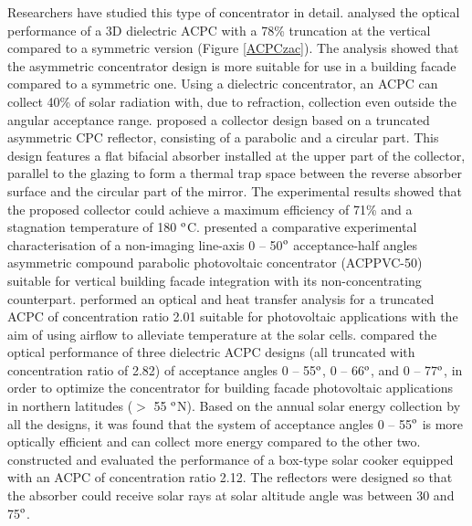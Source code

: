 Researchers have studied this type of concentrator in detail. \citet{Zacharopoulos2000} analysed the optical performance of a 3D dielectric ACPC with a 78\% truncation at the vertical compared to a symmetric version (Figure \ref{ACPCzac}). The analysis showed that the asymmetric concentrator design is more suitable for use in a building facade compared to a symmetric one. Using a dielectric concentrator, an ACPC can collect 40\% of solar radiation with, due to refraction, collection even outside the angular acceptance range. \citet{Tripanagnostopoulos2000} proposed a collector design based on a truncated asymmetric CPC reflector, consisting of a parabolic and a circular part. This design features a flat bifacial absorber installed at the upper part of the collector, parallel to the glazing to form a thermal trap space between the reverse absorber surface and the circular part of the mirror. The experimental results showed that the proposed collector could achieve a maximum efficiency of 71\% and a stagnation temperature of 180 $^{\rm{o}}$C. \citet{Mallick2006} presented a comparative experimental characterisation of a non-imaging line-axis 0 -- 50$^{\rm{o}}$ acceptance-half angles asymmetric compound parabolic photovoltaic concentrator (ACPPVC-50) suitable for vertical building facade integration with its non-concentrating counterpart. \citet{Mallick2007b} performed an optical and heat transfer analysis for a truncated ACPC of concentration ratio 2.01 suitable for photovoltaic applications with the aim of using airflow to alleviate temperature at the solar cells. \citet{Sarmah2011} compared the optical performance of three dielectric ACPC designs (all truncated with concentration ratio of 2.82) of acceptance angles 0 -- 55$^{\rm{o}}$, 0 -- 66$^{\rm{o}}$, and 0 -- 77$^{\rm{o}}$, in order to optimize the concentrator for building facade photovoltaic applications in northern latitudes ($>$ 55 $^{\rm{o}}$N). Based on the annual solar energy collection by all the designs, it was found that the system of acceptance angles 0 -- 55$^{\rm{o}}$ is more optically efficient and can collect more energy compared to the other two. \citet{Harmim2012} constructed and evaluated the performance of a box-type solar cooker equipped with an ACPC of concentration ratio 2.12. The reflectors were designed so that the absorber could receive solar rays at solar altitude angle was between 30 and 75$^{\rm{o}}$.


